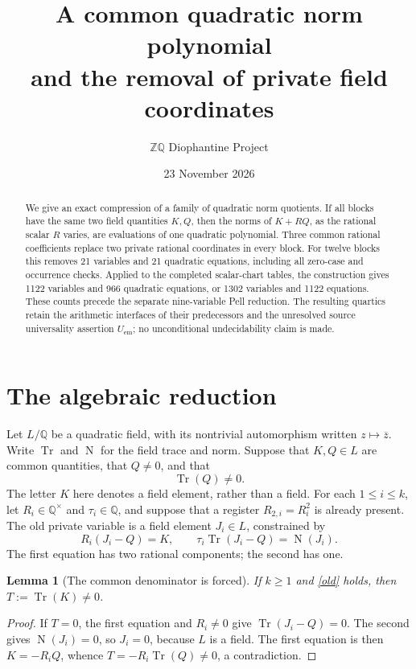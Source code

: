 \documentclass[11pt]{article}
\title{A common quadratic norm polynomial\\
and the removal of private field coordinates}
\author{\(\mathbb Z\mathbb Q\) Diophantine Project}
\date{23 November 2026}
\newtheorem{lemma}[theorem]{Lemma}
\newcommand{\Q}{\mathbb Q}
\newcommand{\Tr}{\operatorname{Tr}}
\newcommand{\Nm}{\operatorname{N}}
\begin{document}
\maketitle
\begin{abstract}
We give an exact compression of a family of quadratic norm quotients.
If all blocks have the same two field quantities \(K,Q\), then the
norms of \(K+RQ\), as the rational scalar \(R\) varies, are evaluations
of one quadratic polynomial. Three common rational coefficients replace
two private rational coordinates in every block. For twelve blocks this
removes 21 variables and 21 quadratic equations, including all zero-case
and occurrence checks. Applied to the completed scalar-chart tables,
the construction gives 1122 variables and 966 quadratic equations, or
1302 variables and 1122 equations. These counts precede the separate
nine-variable Pell reduction. The resulting quartics retain the
arithmetic interfaces of their predecessors and the unresolved source
universality assertion \(U_{\mathrm{em}}\); no unconditional
undecidability claim is made.
\end{abstract}

\section{The algebraic reduction}

Let \(L/\Q\) be a quadratic field, with its nontrivial automorphism
written \(z\mapsto\overline z\). Write \(\Tr\) and \(\Nm\) for
the field trace and norm. Suppose that \(K,Q\in L\) are common
quantities, that \(Q\ne0\), and that
\begin{equation}\label{traceQ}
                           \Tr(Q)\ne0.
\end{equation}
The letter \(K\) here denotes a field element, rather than a field.
For each \(1\le i\le k\), let \(R_i\in\Q^\times\) and
\(\tau_i\in\Q\), and suppose that a register \(R_{2,i}=R_i^2\)
is already present. The old private variable is a field element
\(J_i\in L\), constrained by
\begin{equation}\label{old}
 R_i(J_i-Q)=K,\qquad
 \tau_i\Tr(J_i-Q)=\Nm(J_i).
\end{equation}
The first equation has two rational components; the second has one.

\begin{lemma}[The common denominator is forced]\label{denom}
If \(k\ge1\) and \eqref{old} holds, then \(T:=\Tr(K)\ne0\).
\end{lemma}
\begin{proof}
If \(T=0\), the first equation and \(R_i\ne0\) give
\(\Tr(J_i-Q)=0\). The second gives \(\Nm(J_i)=0\), so
\(J_i=0\), because \(L\) is a field. The first equation is
then \(K=-R_iQ\), whence \(T=-R_i\Tr(Q)\ne0\), a contradiction.
\end{proof}
\end{document}
